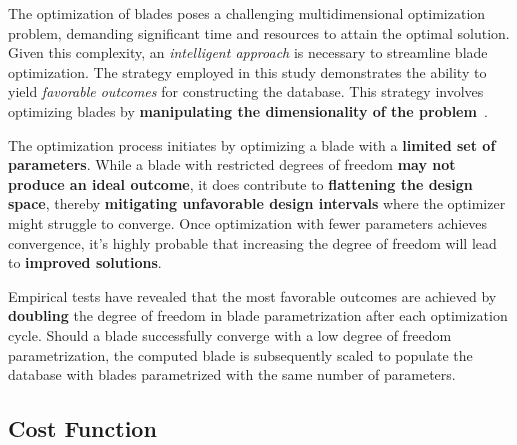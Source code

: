 


The optimization of blades poses a challenging multidimensional optimization problem, demanding significant time and resources to attain the optimal solution. Given this complexity, an \textit{intelligent approach} is necessary to streamline blade optimization. The strategy employed in this study demonstrates the ability to yield \textit{favorable outcomes} for constructing the database. This strategy involves optimizing blades by \textbf{manipulating the dimensionality of the problem}~\cite{clark2019step}.

The optimization process initiates by optimizing a blade with a \textbf{limited set of parameters}. While a blade with restricted degrees of freedom \textbf{may not produce an ideal outcome}, it does contribute to \textbf{flattening the design space}, thereby \textbf{mitigating unfavorable design intervals} where the optimizer might struggle to converge. Once optimization with fewer parameters achieves convergence, it's highly probable that increasing the degree of freedom will lead to \textbf{improved solutions}.

Empirical tests have revealed that the most favorable outcomes are achieved by \textbf{doubling} the degree of freedom in blade parametrization after each optimization cycle. Should a blade successfully converge with a low degree of freedom parametrization, the computed blade is subsequently scaled to populate the database with blades parametrized with the same number of parameters.

\subsection{Cost Function}

